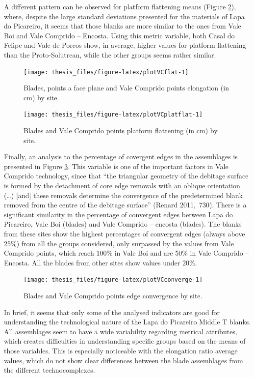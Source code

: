 \documentclass[12pt,twoside]{reedthesis}
\begin{document}
A different pattern can be observed for platform flattening means (Figure \ref{fig:plotVCplatflat}), where, despite the large standard deviations presented for the materials of Lapa do Picareiro, it seems that those blanks are more similar to the ones from Vale Boi and Vale Comprido -- Encosta. Using this metric variable, both Casal do Felipe and Vale de Porcos show, in average, higher values for platform flattening than the Proto-Solutrean, while the other groups seems rather similar.
\begin{figure}[H]

{\centering \texttt{[image: thesis\_files/figure-latex/plotVCflat-1]} 

}

\caption{Blades, points a face plane and Vale Comprido points elongation (in cm) by site.}\label{fig:plotVCflat}
\end{figure}
\begin{figure}[H]

{\centering \texttt{[image: thesis\_files/figure-latex/plotVCplatflat-1]} 

}

\caption{Blades and Vale Comprido points platform flattening (in cm) by site.}\label{fig:plotVCplatflat}
\end{figure}
Finally, an analysis to the percentage of covergent edges in the assemblages is presented in Figure \ref{fig:plotVCconverge}. This variable is one of the important factors in Vale Comprido technology, since that ``the triangular geometry of the debitage surface is formed by the detachment of core edge removals
with an oblique orientation (\ldots) {[}and{]} these removals determine the convergence of the predetermined blank removed from the centre of the debitage surface'' (Renard 2011,~730). There is a significant similarity in the percentage of convergent edges between Lapa do Picareiro, Vale Boi (blades) and Vale Comprido -- encosta (blades). The blanks from these sites show the highest percentages of convergent edges (always above 25\%) from all the groups considered, only surpassed by the values from Vale Comprido points, which reach 100\% in Vale Boi and are 50\% in Vale Comprido -- Encosta. All the blades from other sites show values under 20\%.
\begin{figure}[H]

{\centering \texttt{[image: thesis\_files/figure-latex/plotVCconverge-1]} 

}

\caption{Blades and Vale Comprido points edge convergence by site.}\label{fig:plotVCconverge}
\end{figure}
In brief, it seems that only some of the analysed indicators are good for understanding the technological nature of the Lapa do Picareiro Middle T blanks. All assemblages seem to have a wide variability regarding metrical attributes, which creates difficulties in understanding specific groups based on the means of those variables. This is especially noticeable with the elongation ratio average values, which do not show clear differences between the blade assemblages from the different technocomplexes.
\end{document}
